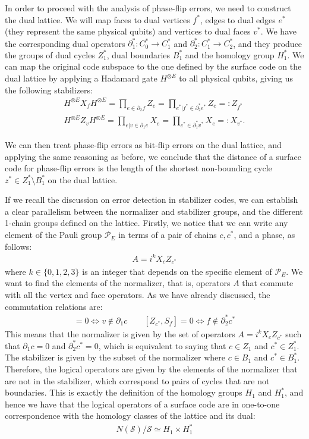 \documentclass[12pt, twoside, openany]{book}
\begin{document}
In order to proceed with the analysis of phase-flip errors, we need to construct the dual lattice. We will map faces to dual vertices $f^*$, edges to dual edges $e^*$ (they represent the same physical qubits) and vertices to dual faces $v^*$. We have the corresponding dual operators $\partial^*_1 : C^*_0 \rightarrow C^*_1$ and $\partial^*_2 : C^*_1 \rightarrow C^*_2$, and they produce the groups of dual cycles $Z^*_1$, dual boundaries $B^*_1$ and the homology group $H^*_1$. We can map the original code subspace to the one defined by the surface code on the dual lattice by applying a Hadamard gate $H^{\otimes E}$ to all physical qubits, giving us the following stabilizers:
\begin{align}
    H^{\otimes E} X_f H^{\otimes E} = \prod_{e \in \partial_2 f} Z_e = \prod_{e^* | f^* \in \partial_2^* e^*} Z_e =: Z_{f^*} \\
H^{\otimes E} Z_v H^{\otimes E} = \prod_{e | v \in \partial_1 e} X_e = \prod_{e^* \in \partial_1^* v^*} X_e =: X_{v^*}.
\end{align}

We can then treat phase-flip errors as bit-flip errors on the dual lattice, and applying the same reasoning as before, we conclude that the distance of a surface code for phase-flip errors is the length of the shortest non-bounding cycle $z^* \in Z^*_1 \setminus B^*_1$ on the dual lattice. 

If we recall the discussion on error detection in stabilizer codes, we can establish a clear parallelism between the normalizer and stabilizer groups, and the different 1-chain groups defined on the lattice. Firstly, we notice that we can write any element of the Pauli group $\mathcal{P}_E$ in terms of a pair of chains $c, c^*$, and a phase, as follows:
\begin{align}
    A = i^k X_c Z_{c^*}
\end{align}
where $k \in \{0, 1, 2, 3\}$ is an integer that depends on the specific element of $\mathcal{P}_E$. We want to find the elements of the normalizer, that is, operators $A$ that commute with all the vertex and face operators. As we have already discussed, the commutation relations are:
\begin{align}
    [X_c, S_v] = 0 \iff v \notin \partial_1 c \quad \quad [Z_{c^*}, S_f] = 0 \iff f \notin \partial_2^* c^*
\end{align}
This means that the normalizer is given by the set of operators $A = i^k X_c Z_{c^*}$ such that $\partial_1 c = 0$ and $\partial_2^* c^* = 0$, which is equivalent to saying that $c \in Z_1$ and $c^* \in Z^*_1$. The stabilizer is given by the subset of the normalizer where $c \in B_1$ and $c^* \in B^*_1$. Therefore, the logical operators are given by the elements of the normalizer that are not in the stabilizer, which correspond to pairs of cycles that are not boundaries. This is exactly the definition of the homology groups $H_1$ and $H^*_1$, and hence we have that the logical operators of a surface code are in one-to-one correspondence with the homology classes of the lattice and its dual: 
\begin{align}
    N(\mathcal{S}) / \mathcal{S} \simeq H_1 \times H^*_1
\end{align}
\end{document}
